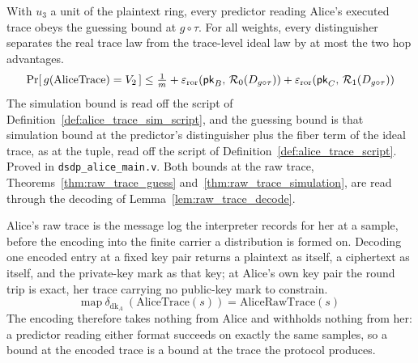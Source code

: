 \begin{theorem}
  \label{thm:alice_trace_bounds}
  \rocqok
  With $u_3$ a unit of the plaintext ring, every predictor reading Alice's
  executed trace obeys the guessing bound at $g \circ \tau$. For all weights,
  every distinguisher separates the real trace law from the trace-level ideal
  law by at most the two hop advantages.
  \[ \Pr[\,g(\mathrm{AliceTrace}) = V_2\,]
       \le \tfrac{1}{m} + \varepsilon_{\mathrm{ror}}(\mathsf{pk}_B,\,\mathcal{R}_{0}(D_{g \circ \tau})) + \varepsilon_{\mathrm{ror}}(\mathsf{pk}_C,\,\mathcal{R}_{1}(D_{g \circ \tau})) \]
  The simulation bound is read off the script of
  Definition~\ref{def:alice_trace_sim_script}, and the guessing bound is that
  simulation bound at the predictor's distinguisher plus the fiber term of the
  ideal trace, as at the tuple, read off the script of
  Definition~\ref{def:alice_trace_script}.
  Proved in \texttt{dsdp\_alice\_main.v}. Both bounds at the raw
  trace, Theorems~\ref{thm:raw_trace_guess}
  and~\ref{thm:raw_trace_simulation}, are read through the decoding of
  Lemma~\ref{lem:raw_trace_decode}.
\end{theorem}

\begin{lemma}
  \label{lem:raw_trace_decode}
  \rocqok
  Alice's raw trace is the message log the interpreter records for her at a
  sample, before the encoding into the finite carrier a distribution is formed
  on. Decoding one encoded entry at a fixed key pair returns a plaintext as
  itself, a ciphertext as itself, and the private-key mark as that key; at
  Alice's own key pair the round trip is exact, her trace carrying no
  public-key mark to constrain.
  \[ \mathrm{map}\ \delta_{\mathrm{dk}_A}\ (\mathrm{AliceTrace}(s))
       = \mathrm{AliceRawTrace}(s) \]
  The encoding therefore takes nothing from Alice and withholds nothing from her: a
  predictor reading either format succeeds on exactly the same samples, so a
  bound at the encoded trace is a bound at the trace the protocol produces.
\end{lemma}

